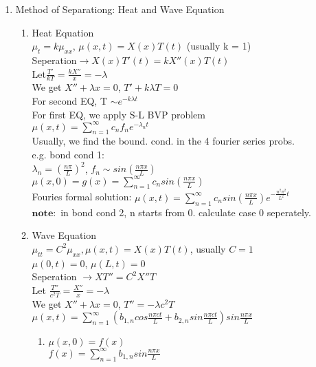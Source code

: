 \documentclass[10pt]{article}
\begin{document}
\begin{multicols}{2}
\begin{enumerate}
\begin{enumerate}
		\end{enumerate}
	
	\item Method of Separationg: Heat and Wave Equation
		\begin{enumerate}
			\item Heat Equation\\
				$\mu_t = k\mu_{xx}$, $\mu(x,t) = X(x)T(t)$ (usually k = 1)\\
				Seperation$\rightarrow X(x)T'(t) = kX''(x)T(t)$\\
				Let$\frac{T'}{kT} = \frac{kX''}{x} = -\lambda$\\
				We get $X'' + \lambda x = 0$, $T' + k\lambda T = 0$\\
				For second EQ, T $\sim e^{-k\lambda t}$\\
				For first EQ, we apply S-L BVP problem\\
				$\mu(x,t) = \sum_{n = 1}^{\infty}c_n f_n e^{-\lambda_n t}$\\
				Usually, we find the bound. cond. in the 4 fourier series probs.\\
				e.g. bond cond 1:\\
				$\lambda_n = (\frac{n \pi}{L})^2$, $f_n \sim sin(\frac{n \pi x}{L})$\\
				$\mu (x,0) = g(x) = \sum_{n = 1}^{\infty}c_n sin(\frac{n\pi x}{L})$\\
				Fouries formal solution: $\mu (x,t) = \sum_{n = 1}^{\infty}c_nsin(\frac{n \pi x}{L})e^{-\frac{n^2\pi^2}{L^2}t}$ \\
				$\mathbf{note}:$ in bond cond 2, n starts from 0. calculate case 0 seperately.
			\item Wave Equation\\
				$\mu_{tt} = C^2\mu_{xx}, \mu(x,t) = X(x)T(t)$, usually $C = 1$\\
				$\mu (0,t) = 0$, $\mu (L,t)=0$\\
			 	Seperation $\rightarrow XT'' = C^2X''T$\\
				Let $\frac{T''}{c^2T} = \frac{X''}{x} = -\lambda$\\
				We get $X'' + \lambda x = 0$, $T'' =  -\lambda c^2T$\\
				$\mu (x,t) = \sum_{n = 1}^{\infty}(b_{1,n}cos\frac{n\pi ct}{L} + b_{2,n}sin\frac{n\pi c t}{L})sin\frac{n\pi x}{L}$
				\begin{enumerate}
					\item $\mu(x,0) = f(x)$\\
					$f(x) = \sum_{n = 1}^{\infty}b_{1,n}sin\frac{n\pi x}{L}$\\

\end{enumerate}
\end{enumerate}
\end{enumerate}
\end{multicols}
\end{document}
